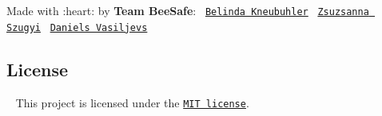 Made with \+:heart\+: by {\bfseries Team Bee\+Safe}\+:~\newline
 \href{https://github.com/itsBelinda/}{\tt Belinda Kneubuhler}~\newline
 \href{https://github.com/szugyizs/}{\tt Zsuzsanna Szugyi}~\newline
 \href{https://github.com/dans-acc/}{\tt Daniels Vasiljevs}~\newline


\subsection*{License}

\href{https://opensource.org/licenses/MIT}{\tt } ~\newline
 This project is licensed under the \href{https://github.com/itsBelinda/ENG5220-2020-Team13/blob/master/LICENSE}{\tt M\+IT license}. 